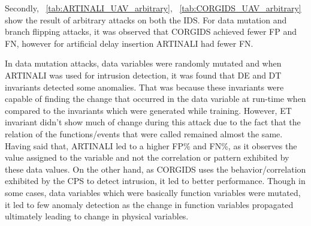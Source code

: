 Secondly, ~\autoref{tab:ARTINALI_UAV_arbitrary}, ~\autoref{tab:CORGIDS_UAV_arbitrary} show the result of arbitrary attacks on both the IDS. For data mutation and branch flipping attacks, it was observed that CORGIDS achieved fewer FP and FN, however for artificial delay insertion ARTINALI had fewer FN.

\begin{table}
\centering
  \caption{Results of intrusion detection by ARTINALI for arbitrary attacks on UAV platform}
  \label{tab:ARTINALI_UAV_arbitrary}
\end{table}

\begin{table}
\centering
  \caption{Results of intrusion detection by CORGIDS for arbitrary attacks on UAV platform}
  \label{tab:CORGIDS_UAV_arbitrary}
\end{table}


In data mutation attacks, data variables were randomly mutated and when ARTINALI was used for intrusion detection, it was found that D\textbar E and D\textbar T invariants detected some anomalies. That was because these invariants were capable of finding the change that occurred in the data variable at run-time when compared to the invariants which were generated while training. However, E\textbar T invariant didn't show much of change during this attack due to the fact that the relation of the functions/events that were called remained almost the same. Having said that, ARTINALI led to a higher FP\% and FN\%, as it observes the value assigned to the variable and not the correlation or pattern exhibited by these data values. On the other hand, as CORGIDS uses the behavior/correlation exhibited by the CPS to detect intrusion, it led to better performance. Though in some cases, data variables which were basically function variables were mutated, it led to few anomaly detection as the change in function variables propagated ultimately leading to change in physical variables.

